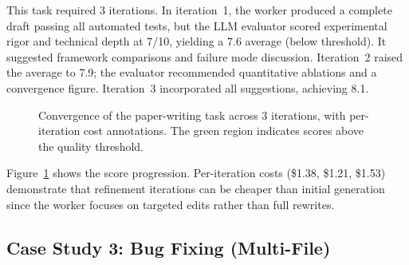 \documentclass{article}
\begin{document}
This task required 3 iterations. In iteration~1, the worker produced a complete draft passing all automated tests, but the LLM evaluator scored experimental rigor and technical depth at 7/10, yielding a 7.6 average (below threshold). It suggested framework comparisons and failure mode discussion. Iteration~2 raised the average to 7.9; the evaluator recommended quantitative ablations and a convergence figure. Iteration~3 incorporated all suggestions, achieving 8.1.

\begin{figure}[t]
\centering
{}
\caption{Convergence of the paper-writing task across 3 iterations, with per-iteration cost annotations. The green region indicates scores above the quality threshold.}
\label{fig:convergence}
\end{figure}

Figure~\ref{fig:convergence} shows the score progression. Per-iteration costs (\$1.38, \$1.21, \$1.53) demonstrate that refinement iterations can be cheaper than initial generation since the worker focuses on targeted edits rather than full rewrites.

\subsection{Case Study 3: Bug Fixing (Multi-File)}
\end{document}
